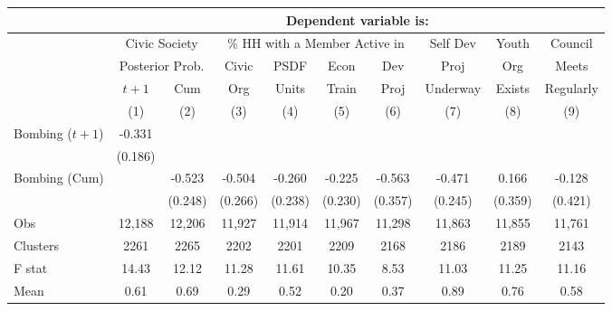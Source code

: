 \begin{tabular}{lccccccccc}
\hline  & \multicolumn{9}{c}{Dependent variable is:}\\
\hline  & \multicolumn{2}{c}{Civic Society} & \multicolumn{4}{c}{\% HH with a Member Active in} & Self Dev & Youth & Council\\
 & \multicolumn{2}{c}{Posterior Prob.} & Civic & PSDF & Econ & Dev & Proj & Org & Meets\\
 & $ t+1$ & Cum & Org & Units & Train & Proj & Underway & Exists & Regularly\\
 & (1) & (2) & (3) & (4) & (5) & (6) & (7) & (8) & (9)\\
\hline Bombing ($ t+1$) & -0.331 &  &  &  &  &  &  &  & \\
 & (0.186) &  &  &  &  &  &  &  & \\
Bombing (Cum) &  & -0.523 & -0.504 & -0.260 & -0.225 & -0.563 & -0.471 & 0.166 & -0.128\\
 &  & (0.248) & (0.266) & (0.238) & (0.230) & (0.357) & (0.245) & (0.359) & (0.421)\\
Obs & 12,188 & 12,206 & 11,927 & 11,914 & 11,967 & 11,298 & 11,863 & 11,855 & 11,761\\
Clusters & 2261  & 2265  & 2202  & 2201  & 2209  & 2168  & 2186  & 2189  & 2143 \\
F stat & 14.43  & 12.12  & 11.28  & 11.61  & 10.35  & 8.53  & 11.03  & 11.25  & 11.16 \\
Mean & 0.61 & 0.69 & 0.29 & 0.52 & 0.20 & 0.37 & 0.89 & 0.76 & 0.58\\
\hline\end{tabular}\\
